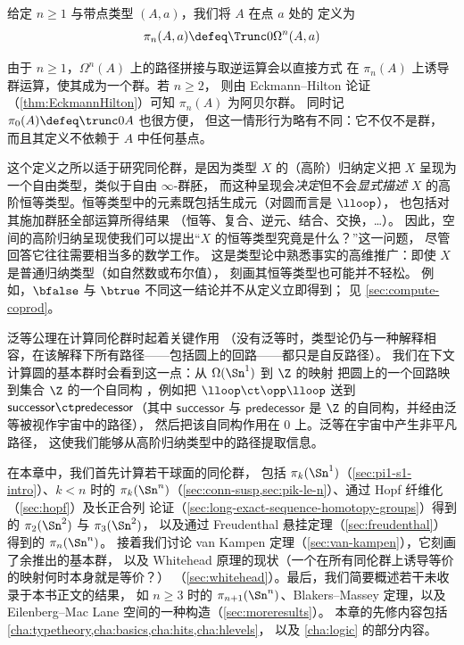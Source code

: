 \begin{defn}[同伦群]\label{def-of-homotopy-groups}
  给定 $n\ge 1$ 与带点类型 $(A,a)$，我们将 $A$ 在点 $a$ 处的
  定义为
  \[\pi_n(A,a)\defeq \Trunc0{\Omega^n(A,a)}\]
\end{defn}

\noindent
由于 $n\ge 1$，$\Omega^n(A)$ 上的路径拼接与取逆运算会以直接方式
在 $\pi_n(A)$ 上诱导群运算，使其成为一个群。若 $n\ge 2$，
则由 Eckmann--Hilton 论证（\cref{thm:EckmannHilton}）可知
$\pi_n(A)$ 为阿贝尔群。
同时记 $\pi_0(A) \defeq \trunc0 A$ 也很方便，
但这一情形行为略有不同：它不仅不是群，
而且其定义不依赖于 $A$ 中任何基点。

%
这个定义之所以适于研究同伦群，是因为类型 $X$ 的（高阶）归纳定义把 $X$ 呈现为
一个自由类型，类似于自由 $\infty$-群胚，
%
而这种呈现会\emph{决定}但不会\emph{显式描述}
$X$ 的高阶恒等类型。恒等类型中的元素既包括生成元（对圆而言是 $\lloop$），
也包括对其施加群胚全部运算所得结果
（恒等、复合、逆元、结合、交换，\ldots）。
因此，空间的高阶归纳呈现使我们可以提出“$X$ 的恒等类型究竟是什么？”这一问题，
尽管回答它往往需要相当多的数学工作。
这是类型论中熟悉事实的高维推广：即使 $X$ 是普通归纳类型（如自然数或布尔值），
刻画其恒等类型也可能并不轻松。
例如，$\bfalse$ 与 $\btrue$ 不同这一结论并不从定义立即得到；
见 \cref{sec:compute-coprod}。

%
泛等公理在计算同伦群时起着关键作用
（没有泛等时，类型论仍与一种解释相容，在该解释下所有路径——包括圆上的回路——都只是自反路径）。
我们在下文计算圆的基本群时会看到这一点：从 $\Omega(\Sn^1)$ 到 $\Z$ 的映射
把圆上的一个回路映到集合 $\Z$ 的一个自同构
，例如把 $\lloop \ct \opp
\lloop$ 送到 $\mathsf{successor} \ct \mathsf{predecessor}$（其中
$\mathsf{successor}$ 与 $\mathsf{predecessor}$ 是 $\Z$ 的自同构，并经由泛等被视作宇宙中的路径），
然后把该自同构作用在 $0$ 上。泛等在宇宙中产生非平凡路径，
这使我们能够从高阶归纳类型中的路径提取信息。

在本章中，我们首先计算若干球面的同伦群，
包括 $\pi_k(\Sn ^1)$（\cref{sec:pi1-s1-intro}）、$k<n$ 时的 $\pi_{k}(\Sn
^n)$（\cref{sec:conn-susp,sec:pik-le-n}）、通过 Hopf 纤维化（\cref{sec:hopf}）及长正合列
论证（\cref{sec:long-exact-sequence-homotopy-groups}）得到的 $\pi_2(\Sn ^2)$ 与 $\pi_3(\Sn ^2)$，
以及通过 Freudenthal 悬挂定理（\cref{sec:freudenthal}）得到的 $\pi_n(\Sn ^n)$。
接着我们讨论 van Kampen 定理（\cref{sec:van-kampen}），它刻画了余推出的基本群，
以及 Whitehead 原理的现状（一个在所有同伦群上诱导等价的映射何时本身就是等价？）
（\cref{sec:whitehead}）。最后，我们简要概述若干未收录于本书正文的结果，
如 $n\ge 3$ 时的 $\pi_{n+1}(\Sn ^n)$、Blakers--Massey 定理，以及
Eilenberg--Mac Lane 空间的一种构造（\cref{sec:moreresults}）。
本章的先修内容包括 \cref{cha:typetheory,cha:basics,cha:hits,cha:hlevels}，
以及 \cref{cha:logic} 的部分内容。

